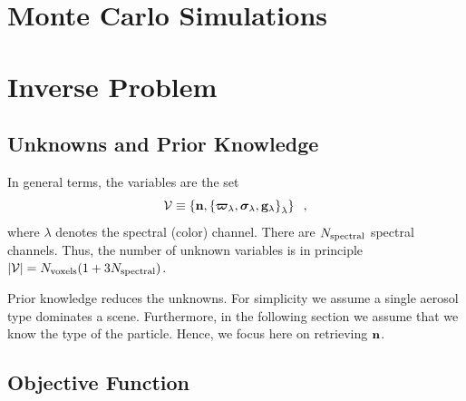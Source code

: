 \documentclass[10pt,letterpaper]{article}
\newcommand{\vect}[1]{\bm{#1}}
\begin{document}



\section{Monte Carlo Simulations}
\label{sec:monte-carlo-simul}


\section{Inverse Problem}
\label{sec:inverse-problem}


\subsection{Unknowns and Prior Knowledge}
\label{sec:prior}

In general terms, the variables are the set
\begin{equation}
  {\cal V}\equiv
  \left\{
    {\bf n},
    \left\{
      \vect{\varpi}_{\lambda},\vect{\sigma}_{\lambda},{\bf g}_{\lambda}
    \right\}_{\lambda}
  \right\}
  \;\;,
  \label{eq:calV}
\end{equation}
where $\lambda$ denotes the spectral (color) channel.  There are
$N_{\rm spectral}$ spectral channels.  Thus, the number of unknown
variables is in principle \mbox{$|{\cal V}|=N_{\rm voxels}(1+3N_{\rm
    spectral})$}.

Prior knowledge reduces the unknowns. For simplicity we assume a
single aerosol type dominates a scene. Furthermore, in the following
section we assume that we know the type of the particle. Hence, we
focus here on retrieving ${\bf n}$.


\subsection{Objective Function}
\label{sec:objective-function}
\end{document}
